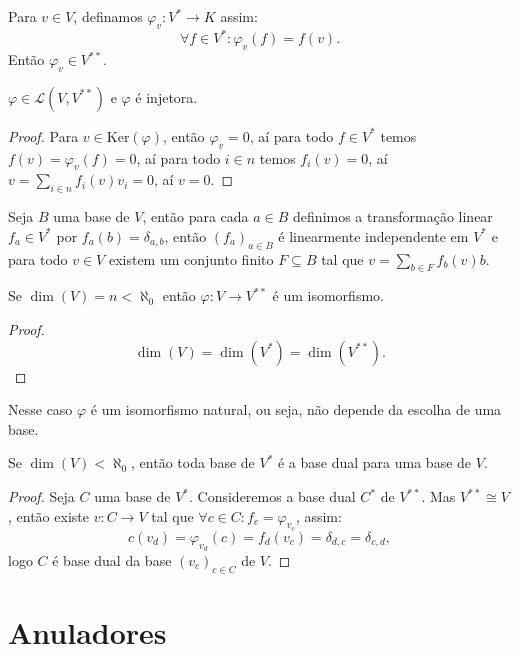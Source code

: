 \documentclass[11pt,twoside,a4paper]{book}
\begin{document}
\begin{definicao}
Para $v\in V$, definamos $\varphi_v:V^*\rightarrow K$ assim:
\[
\forall f\in V^*:\varphi_v(f)=f(v).
\]
Então $\varphi_v\in V^{**}$.
\end{definicao}

\begin{proposicao}
$\varphi\in\mathcal{L}(V,V^{**})$ e $\varphi$ é injetora.
\end{proposicao}
\begin{proof}
Para $v\in\mathrm{Ker}(\varphi)$, então $\varphi_v=0$, aí para todo $f\in V^*$ temos $f(v)=\varphi_v(f)=0$, aí para todo $i\in n$ temos $f_i(v)=0$, aí $v=\sum_{i\in n}f_i(v)v_i=0$, aí $v=0$.
\end{proof}

\noindent
Seja $B$ uma base de $V$, então para cada $a\in B$ definimos a transformação linear $f_a\in V^*$ por $f_a(b)=\delta_{a,b}$, então $(f_a)_{a\in B}$ é linearmente independente em $V^*$ e para todo $v\in V$ existem um conjunto finito $F\subseteq B$ tal que $v=\sum_{b\in F}f_b(v)b$.

\begin{corolario}
Se $\dim(V)=n<\aleph_0$ então $\varphi:V\rightarrow V^{**}$ é um isomorfismo.
\end{corolario}
\begin{proof}
\[
\dim(V)=\dim(V^*)=\dim(V^{**}).
\]
\end{proof}

\begin{observacao}
Nesse caso $\varphi$ é um isomorfismo natural, ou seja, não depende da escolha de uma base.
\end{observacao}

\begin{corolario}
Se $\dim(V)<\aleph_0$, então toda base de $V^*$ é a base dual para uma base de $V$.
\end{corolario}
\begin{proof}
Seja $C$ uma base de $V^*$. Consideremos a base dual $C^*$ de $V^{**}$. Mas $V^{**}\cong V$, então existe $v:C\rightarrow V$ tal que $\forall c\in C:f_c=\varphi_{v_c}$, assim:
\[
c(v_d)=\varphi_{v_d}(c)=f_d(v_c)=\delta_{d,c}=\delta_{c,d},
\]
logo $C$ é base dual da base $(v_c)_{c\in C}$ de $V$.
\end{proof}

\section{Anuladores}
\end{document}
